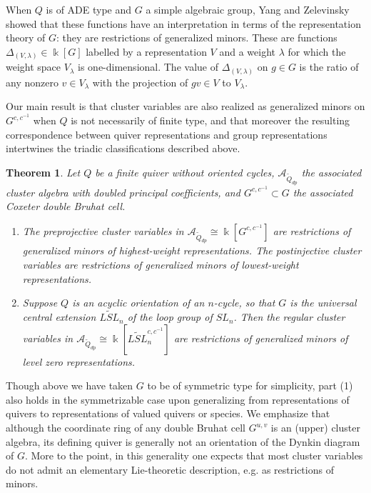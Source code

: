 \documentclass[12pt]{amsart}
\newcommand{\cA}{\mathcal{A}}
\newcommand{\kk}{\Bbbk}
\newcommand{\Qdp}{\widetilde{Q}_{dp}}
\newtheorem{theorem}{Theorem}[section]
\theoremstyle{remark}
\numberwithin{equation}{section}
\numberwithin{figure}{section}
\begin{document}
When $Q$ is of ADE type and $G$ a simple algebraic group, Yang and Zelevinsky \cite{YZ08} showed that these functions have an interpretation in terms of the representation theory of $G$: they are restrictions of generalized minors.
These are functions $\Delta_{(V,\lambda)} \in \kk[G]$ labelled by a representation $V$ and a weight $\lambda$ for which the weight space $V_\lambda$ is one-dimensional.  The value of $\Delta_{(V,\lambda)}$ on $g \in G$ is the ratio of any nonzero $v \in V_\lambda$ with the projection of $gv \in V$ to $V_\lambda$.

Our main result is that cluster variables are also realized as generalized minors on $G^{c,c^{-1}}$ when $Q$ is not necessarily of finite type, and that moreover the resulting correspondence between quiver representations and group representations intertwines the triadic classifications described above.

\begin{theorem}
  \label{thm:maintheorem}
  Let $Q$ be a finite quiver without oriented cycles, $\cA_{\Qdp}$ the associated cluster algebra with doubled principal coefficients, and $G^{c,c^{-1}} \subset G$ the associated Coxeter double Bruhat cell.
  \begin{enumerate}
    \item
      The preprojective cluster variables in $\cA_{\Qdp} \cong \kk[G^{c,c^{-1}}]$ are restrictions of generalized minors of highest-weight representations.
      The postinjective cluster variables are restrictions of generalized minors of lowest-weight representations.
    \item
      Suppose $Q$ is an acyclic orientation of an $n$-cycle, so that $G$ is the universal central extension $\widetilde{LSL}_n$ of the loop group of $SL_n$.
      Then the regular cluster variables in $\cA_{\Qdp}\cong \kk[\widetilde{LSL}_n^{c,c^{-1}}]$ are restrictions of generalized minors of level zero representations.
  \end{enumerate}
\end{theorem}

Though above we have taken $G$ to be of symmetric type for simplicity, part (1) also holds in the symmetrizable case upon generalizing from representations of quivers to representations of valued quivers or species.
We emphasize that although the coordinate ring of any double Bruhat cell $G^{u,v}$ is an (upper) cluster algebra, its defining quiver is generally not an orientation of the Dynkin diagram of $G$.
More to the point, in this generality one expects that most cluster variables do not admit an elementary Lie-theoretic description, e.g. as restrictions of minors.
\end{document}
